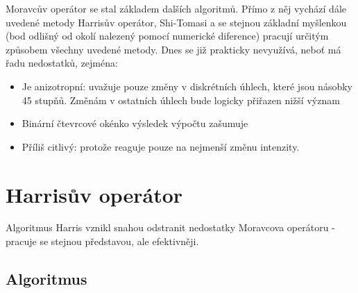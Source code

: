 Moravcův operátor se stal základem dalších algoritmů. Přímo z něj vychází dále uvedené metody Harrisův operátor, Shi-Tomasi a se stejnou základní myšlenkou (bod odlišný od okolí nalezený pomocí numerické diference) pracují určitým způsobem všechny uvedené metody. Dnes se již prakticky nevyužívá, neboť má řadu nedostatků, zejména:

\begin{itemize}
	\item Je anizotropní: uvažuje pouze změny v diskrétních úhlech, které jsou násobky 45 stupňů. Změnám v ostatních úhlech bude logicky přiřazen nižší význam
	\item Binární čtevrcové okénko výsledek výpočtu zašumuje
	\item Příliš citlivý: protože reaguje pouze na nejmenší změnu intenzity.
\end{itemize}

\section{Harrisův operátor}
		
Algoritmus Harris \cite{harris1988combined} vznikl snahou odstranit nedostatky Moravcova operátoru - pracuje se stejnou představou, ale efektivněji.

\subsection{Algoritmus}	
\label{harris_alg}

